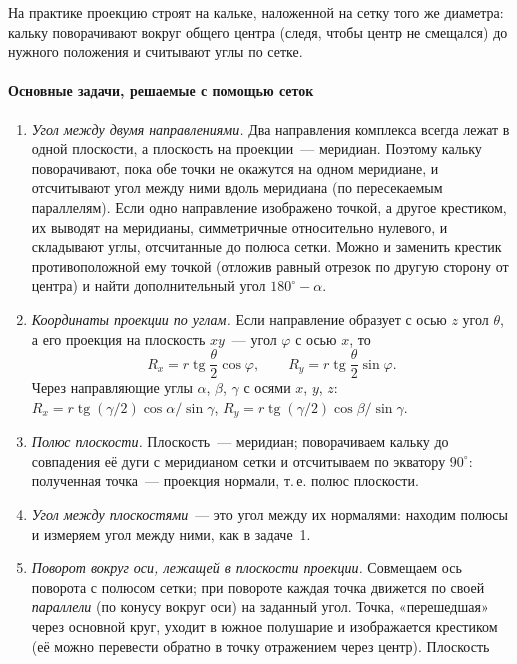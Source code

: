 На практике проекцию строят на кальке, наложенной на сетку того же
диаметра: кальку поворачивают вокруг общего центра (следя, чтобы центр не
смещался) до нужного положения и считывают углы по сетке.

\paragraph{Основные задачи, решаемые с помощью сеток}
\begin{enumerate}
\item \emph{Угол между двумя направлениями.} Два направления комплекса
всегда лежат в одной плоскости, а плоскость на проекции~— меридиан.
Поэтому кальку поворачивают, пока обе точки не окажутся на одном
меридиане, и отсчитывают угол между ними вдоль меридиана (по
пересекаемым параллелям). Если одно направление изображено точкой, а
другое крестиком, их выводят на меридианы, симметричные относительно
нулевого, и складывают углы, отсчитанные до полюса сетки. Можно и
заменить крестик противоположной ему точкой (отложив равный отрезок по
другую сторону от центра) и найти дополнительный угол $180^\circ-\alpha$.
\item \emph{Координаты проекции по углам.} Если направление образует с
осью $z$ угол $\theta$, а его проекция на плоскость $xy$~— угол $\varphi$
с осью $x$, то
\begin{equation}\label{eq:stereo-xy}
R_x=r\operatorname{tg}\frac\theta2\cos\varphi,\qquad R_y=r\operatorname{tg}\frac\theta2\sin\varphi .
\end{equation}
Через направляющие углы $\alpha$, $\beta$, $\gamma$ с осями $x$, $y$, $z$:
$R_x=r\operatorname{tg}(\gamma/2)\cos\alpha/\sin\gamma$,
$R_y=r\operatorname{tg}(\gamma/2)\cos\beta/\sin\gamma$.
\item \emph{Полюс плоскости.} Плоскость~— меридиан; поворачиваем кальку до
совпадения её дуги с меридианом сетки и отсчитываем по экватору
$90^\circ$: полученная точка~— проекция нормали, т.\,е. полюс плоскости.
\item \emph{Угол между плоскостями}~— это угол между их нормалями:
находим полюсы и измеряем угол между ними, как в задаче~1.
\item \emph{Поворот вокруг оси, лежащей в плоскости проекции.} Совмещаем
ось поворота с полюсом сетки; при повороте каждая точка движется по своей
\emph{параллели} (по конусу вокруг оси) на заданный угол. Точка, «перешедшая»
через основной круг, уходит в южное полушарие и изображается крестиком
(её можно перевести обратно в точку отражением через центр). Плоскость

\end{enumerate}
